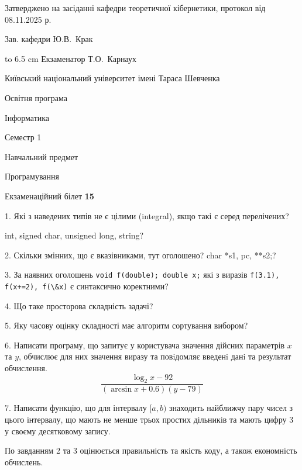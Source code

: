 \documentclass[12pt, ukrainian]{article}
\def\code#1{\Verb!#1!}
\begin{document}
{\smallskip\smallskip \begin {scriptsize} Затверджено на засіданні кафедри теоретичної кібернетики, протокол   від   08.11.2025 р.\par\smallskip\smallskip\smallskip\smallskip
{\parbox {6.5 cm} {Зав. кафедри \dotfill Ю.В.~Крак}}\hspace {0.7cm} {\hbox to 6.5 cm { Екзаменатор \dotfill Т.О.~Карнаух}} \end{scriptsize}}
\newpage
{{\begin {scriptsize}\par
{ \center  Київський національний університет імені Тараса Шевченка \par}
{\parbox {5 cm}{Освітня програма \hfill}{\parbox {7 cm}{Інформатика\hfill}}\parbox {6 cm}{\hfill Семестр 1}}\par
{\parbox {5 cm} {Навчальний предмет \hfill}\parbox {7 cm}{Програмування \hfill}\parbox {6cm}{\hfill}\par}\vspace{-15pt} \end{scriptsize}}{\center Екзаменаційний білет \No \textbf { 15 }\par}}
{%
1. Які з наведених типів не є цілими (integral), якщо такі є серед перелічених?

int, signed char, unsigned long, string?
\par
\vspace{2mm}
2. Скільки змінних, що є вказівниками, тут оголошено?
char *s1, pc, **s2;?
\par
\vspace{2mm}
3. За наявних оголошень \code{void f(double); double x;} які з виразів \code{f(3.1), f(x+=2), f(\&x)} є синтаксично коректними?
\par
\vspace{2mm}
4. Що таке просторова складність задачі?
\par
\vspace{2mm}
5. Яку часову оцінку складності має алгоритм сортування вибором?
\par
\vspace{2mm}
6. Написати програму, що запитує у користувача значення дійсних параметрів $x$ та $y$, обчислює для них значення виразу та повiдомляє введенi данi та результат обчислення.
$$\frac{\log_{2} x - 92}{(\arcsin x + 0.6) (y - 79)}$$ 

\par
7. Написати функцію, що для інтервалу $[a, b)$ знаходить найближчу пару чисел з цього інтервалу, що мають не менше трьох простих дільників та мають цифру 3 у своєму десятковому запису.

По завданням 2 та 3 оцінюється правильність та якість коду, а також економність обчислень.

}
\end{document}
